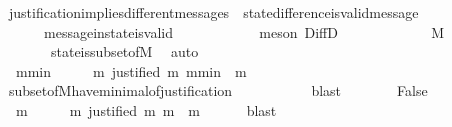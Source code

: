 \begin{isabellebody}
\ justification{\isacharunderscore}implies{\isacharunderscore}different{\isacharunderscore}messages\ \ state{\isacharunderscore}difference{\isacharunderscore}is{\isacharunderscore}valid{\isacharunderscore}message\isanewline
\ \ \ \ \ \ message{\isacharunderscore}in{\isacharunderscore}state{\isacharunderscore}is{\isacharunderscore}valid\ \ {\isacartoucheopen}{\isasymsigma}{\isacharprime}\ {\isasymsubset}\ {\isasymsigma}{\isacartoucheclose}\isanewline
\ \ \ \ \ \ \isamarkupfalse%
\ {\isacharparenleft}meson\ DiffD{}\ {\isacartoucheopen}{\isasymsigma}\ {\isasymin}\ {\isasymSigma}{\isacartoucheclose}{\isacharparenright}\isanewline
\ \ \ \ \isamarkupfalse%
\ {\isachardoublequoteopen}{\isasymsigma}\ {\isacharminus}\ {\isasymsigma}{\isacharprime}\ {\isasymsubseteq}\ M{\isachardoublequoteclose}\isanewline
\ \ \ \ \ \ \isamarkupfalse%
\ {\isacartoucheopen}{\isasymsigma}\ {\isasymin}\ {\isasymSigma}{\isacartoucheclose}\ {\isacartoucheopen}{\isasymsigma}{\isacharprime}\ {\isasymsubset}\ {\isasymsigma}{\isacartoucheclose}\ state{\isacharunderscore}is{\isacharunderscore}subset{\isacharunderscore}of{\isacharunderscore}M\ \isamarkupfalse%
\ auto\isanewline
\ \ \ \ \isamarkupfalse%
\ \isamarkupfalse%
\ {\isachardoublequoteopen}{\isasymexists}\ m{\isacharunderscore}min\ {\isasymin}\ {\isasymsigma}\ {\isacharminus}\ {\isasymsigma}{\isacharprime}{\isachardot}\ {\isasymforall}\ m{\isachardot}\ justified\ m\ m{\isacharunderscore}min\ {\isasymlongrightarrow}\ m\ {\isasymnotin}\ {\isasymsigma}\ {\isacharminus}\ {\isasymsigma}{\isacharprime}{\isachardoublequoteclose}\isanewline
\ \ \ \ \ \ \isamarkupfalse%
\ subset{\isacharunderscore}of{\isacharunderscore}M{\isacharunderscore}have{\isacharunderscore}minimal{\isacharunderscore}of{\isacharunderscore}justification\ {\isacartoucheopen}{\isasymsigma}{\isacharprime}\ {\isasymsubset}\ {\isasymsigma}{\isacartoucheclose}\isanewline
\ \ \ \ \ \ \isamarkupfalse%
\ blast\isanewline
\ \ \ \ \isamarkupfalse%
\ \isamarkupfalse%
\ False\isanewline
\ \ \ \ \ \ \isamarkupfalse%
\ {\isacartoucheopen}{\isasymforall}\ m\ {\isasymin}\ {\isasymsigma}\ {\isacharminus}\ {\isasymsigma}{\isacharprime}{\isachardot}\ {\isasymexists}\ m{\isacharprime}{\isachardot}\ justified\ m{\isacharprime}\ m\ {\isasymand}\ m{\isacharprime}\ {\isasymin}\ {\isasymsigma}\ {\isacharminus}\ {\isasymsigma}{\isacharprime}{\isacartoucheclose}\ \isamarkupfalse%
\ blast\isanewline

\end{isabellebody}
